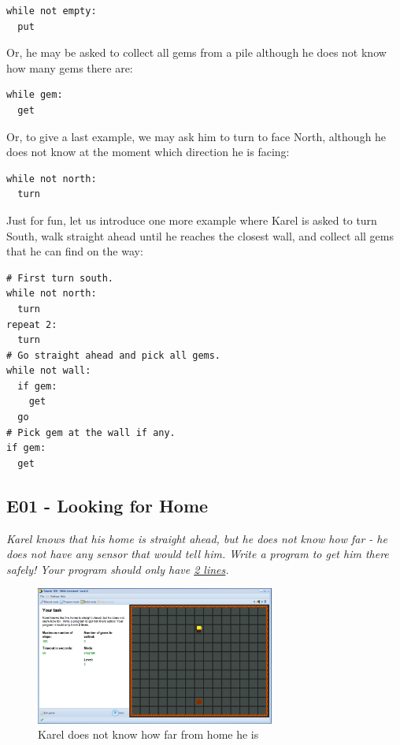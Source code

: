 \documentclass[article,A4,12pt]{llncs}
\begin{document}
\begin{verbatim}
while not empty:
  put
\end{verbatim}
Or, he may be asked to collect all gems from a pile although he does
not know how many gems there are:

\begin{verbatim}
while gem:
  get
\end{verbatim}
Or, to give a last example, we may ask him to turn to face North, 
although he does not know at the moment which direction he is
facing:

\begin{verbatim}
while not north:
  turn
\end{verbatim}
Just for fun, let us introduce one more example where Karel is asked to 
turn South, walk straight ahead until he reaches the closest wall, and 
collect all gems that he can find on the way:

{\small
\begin{verbatim}
# First turn south.
while not north:
  turn
repeat 2:
  turn
# Go straight ahead and pick all gems.
while not wall:
  if gem:
    get
  go
# Pick gem at the wall if any.
if gem:
  get
\end{verbatim}
}

\newpage
\subsection{E01 - Looking for Home}

{\em Karel knows that his home is straight ahead, but he does not know how far - he does not 
have any sensor that would tell him. 
Write a program to get him there safely! Your program should only have \underline{2 lines}.}\\[-7mm]

\begin{figure}[!ht]
\begin{center}
\includegraphics[width=0.7\textwidth]{img/e01.png}
\end{center}
\vspace{-4mm}
\caption{Karel does not know how far from home he is}
\label{fig:e01}
\vspace{-12mm}
\end{figure}
\noindent
\end{document}
